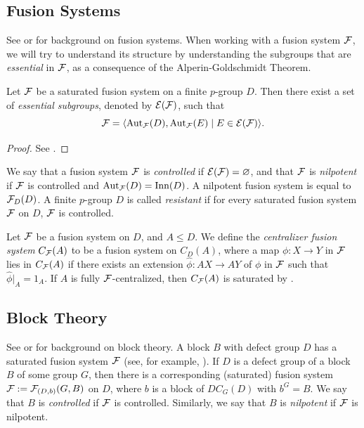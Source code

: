 \documentclass[bysection, amsart]{standard}
\begin{document}
\subsection{Fusion Systems}
See \cite{book:cra} or \cite{ako} for background on fusion systems. When working with a fusion system $\mathcal{F}$, we will try to understand its structure by understanding the subgroups that are \emph{essential} in $\mathcal{F}$, as a consequence of the Alperin-Goldschmidt Theorem.
\begin{theorem}
    Let $\mathcal{F}$ be a saturated fusion system on a finite $p$-group $D$. Then there exist a set of \emph{essential subgroups}, denoted by $\mathcal{E}(\mathcal{F})$, such that
    \[\mathcal{F} = \langle \operatorname{Aut}_{\mathcal{F}}(D), \operatorname{Aut}_{\mathcal{F}}(E) \mid E \in \mathcal{E}(\mathcal{F}) \rangle.\]
\end{theorem}
\begin{proof}
    See \cite[Theorem I.3.5]{ako}.
\end{proof}
\noindent We say that a fusion system $\mathcal{F}$ is \emph{controlled} if $\mathcal{E}(\mathcal{F}) = \varnothing$, and that $\mathcal{F}$ is \emph{nilpotent} if $\mathcal{F}$ is controlled and $\operatorname{Aut}_{\mathcal{F}}(D) = \operatorname{Inn}(D)$. A nilpotent fusion system is equal to $\mathcal{F}_D(D)$. A finite $p$-group $D$ is called \emph{resistant} if for every saturated fusion system $\mathcal{F}$ on $D$, $\mathcal{F}$ is controlled.

Let $\mathcal{F}$ be a fusion system on $D$, and $A \leq D$. We define the \emph{centralizer fusion system} $C_{\mathcal{F}}(A)$ to be a fusion system on $C_D(A)$, where a map $\phi \colon X \to Y$ in $\mathcal{F}$ lies in $C_{\mathcal{F}}(A)$ if there exists an extension $\hat{\phi} \colon AX \to AY$ of $\phi$ in $\mathcal{F}$ such that $\hat{\phi}|_A = 1_A$. If $A$ is fully $\mathcal{F}$-centralized, then $C_{\mathcal{F}}(A)$ is saturated by \cite[Theorem 4.28]{book:cra}.

\subsection{Block Theory} See \cite{book:alperin-local-rep-theory} or \cite{book:navarro} for background on block theory. A block $B$ with defect group $D$ has a saturated fusion system $\mathcal{F}$ (see, for example, \cite[Part IV]{ako}). If $D$ is a defect group of a block $B$ of some group $G$, then there is a corresponding (saturated) fusion system $\mathcal{F} := \mathcal{F}_{(D, b)}(G, B)$ on $D$, where $b$ is a block of $DC_G(D)$ with $b^G = B$. We say that $B$ is \emph{controlled} if $\mathcal{F}$ is controlled. Similarly, we say that $B$ is \emph{nilpotent} if $\mathcal{F}$ is nilpotent.
\end{document}
